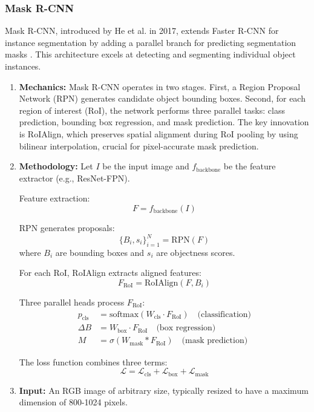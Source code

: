 \documentclass[conference]{IEEEtran}
\begin{document}
\subsubsection{Mask R-CNN}
Mask R-CNN, introduced by He et al. in 2017, extends Faster R-CNN for instance segmentation by adding a parallel branch for predicting segmentation masks \cite{he2017mask}. This architecture excels at detecting and segmenting individual object instances.

\begin{enumerate}
	\item \textbf{Mechanics:}
	Mask R-CNN operates in two stages. First, a Region Proposal Network (RPN) generates candidate object bounding boxes. Second, for each region of interest (RoI), the network performs three parallel tasks: class prediction, bounding box regression, and mask prediction. The key innovation is RoIAlign, which preserves spatial alignment during RoI pooling by using bilinear interpolation, crucial for pixel-accurate mask prediction.
	
	\item \textbf{Methodology:}
	Let $I$ be the input image and $f_{\text{backbone}}$ be the feature extractor (e.g., ResNet-FPN).
	
	Feature extraction:
	\[
	F = f_{\text{backbone}}(I)
	\]
	
	RPN generates proposals:
	\[
	\{B_i, s_i\}_{i=1}^N = \text{RPN}(F)
	\]
	where $B_i$ are bounding boxes and $s_i$ are objectness scores.
	
	For each RoI, RoIAlign extracts aligned features:
	\[
	F_{\text{RoI}} = \text{RoIAlign}(F, B_i)
	\]
	
	Three parallel heads process $F_{\text{RoI}}$:
	\begin{align*}
		p_{\text{cls}} &= \text{softmax}(W_{\text{cls}} \cdot F_{\text{RoI}}) \quad \text{(classification)} \\
		\Delta B &= W_{\text{box}} \cdot F_{\text{RoI}} \quad \text{(box regression)} \\
		M &= \sigma(W_{\text{mask}} * F_{\text{RoI}}) \quad \text{(mask prediction)}
	\end{align*}
	
	The loss function combines three terms:
	\[
	\mathcal{L} = \mathcal{L}_{\text{cls}} + \mathcal{L}_{\text{box}} + \mathcal{L}_{\text{mask}}
	\]
	
	\item \textbf{Input:}
	An RGB image of arbitrary size, typically resized to have a maximum dimension of 800-1024 pixels.
	

\end{enumerate}
\end{document}
